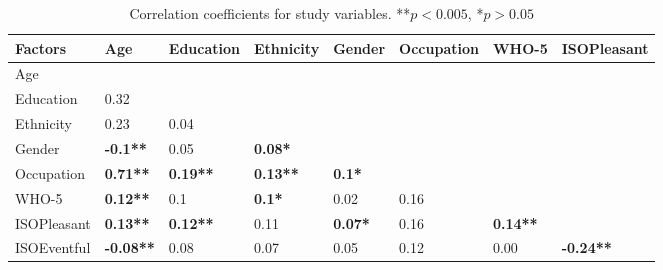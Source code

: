 \begin{table}[!h]
  \centering
  \caption{Correlation coefficients for study variables. **$p<0.005$, *$p>0.05$\label{tab:whoCorr}}
  \begin{tabular}{@{}l|lllllll@{}}
    \toprule
    Factors     & Age              & Education       & Ethnicity       & Gender         & Occupation & WHO-5            & ISOPleasant      \\ \midrule
    Age         &                  &                 &                 &                &            &                  &                  \\
    Education   & 0.32             &                 &                 &                &            &                  &                  \\
    Ethnicity   & 0.23             & 0.04            &                 &                &            &                  &                  \\
    Gender      & \textbf{-0.1**}  & 0.05            & \textbf{0.08*}  &                &            &                  &                  \\
    Occupation  & \textbf{0.71**}  & \textbf{0.19**} & \textbf{0.13**} & \textbf{0.1*}  &            &                  &                  \\
    WHO-5       & \textbf{0.12**}  & 0.1             & \textbf{0.1*}   & 0.02           & 0.16       &                  &                  \\
    ISOPleasant & \textbf{0.13**}  & \textbf{0.12**} & 0.11            & \textbf{0.07*} & 0.16       & \textbf{0.14**}  &                  \\
    ISOEventful & \textbf{-0.08**} & 0.08            & 0.07            & 0.05           & 0.12       & 0.00             & \textbf{-0.24**}  \\ \bottomrule
  \end{tabular}
\end{table}

